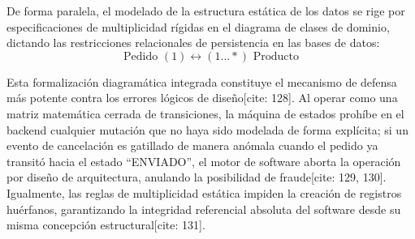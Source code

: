 \documentclass[11pt,a4paper]{article}
\begin{document}
	De forma paralela, el modelado de la estructura estática de los datos se rige por especificaciones de multiplicidad rígidas en el diagrama de clases de dominio, dictando las restricciones relacionales de persistencia en las bases de datos:
	$$\text{Pedido } (1) \longleftrightarrow (1\dots*) \text{ Producto}$$
	
	Esta formalización diagramática integrada constituye el mecanismo de defensa más potente contra los errores lógicos de diseño[cite: 128]. Al operar como una matriz matemática cerrada de transiciones, la máquina de estados prohíbe en el backend cualquier mutación que no haya sido modelada de forma explícita; si un evento de cancelación es gatillado de manera anómala cuando el pedido ya transitó hacia el estado ``ENVIADO'', el motor de software aborta la operación por diseño de arquitectura, anulando la posibilidad de fraude[cite: 129, 130]. Igualmente, las reglas de multiplicidad estática impiden la creación de registros huérfanos, garantizando la integridad referencial absoluta del software desde su misma concepción estructural[cite: 131].
	
\end{document}
